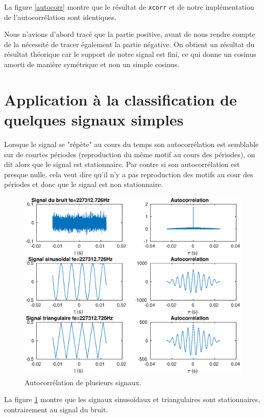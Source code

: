 \documentclass[french]{article}
\begin{document}
La figure \ref{autocorr} montre que le résultat de \verb`xcorr` et de notre implémentation de l'autocorrélation sont identiques.

Nous n'avions d'abord tracé que la partie positive, avant de nous rendre compte de la nécessité de tracer également la partie négative.
On obtient un résultat du résultat théorique car le support de notre signal est fini, ce qui donne un cosinus amorti de manière symétrique et non un simple cosinus.

\section{ Application à la classification de quelques signaux simples}

Lorsque le signal se "répète" au cours du temps son autocorrélation est semblable sur de courtes périodes (reproduction du même motif au cours des périodes), on dit alors que le signal est stationnaire. Par contre si son autocorrélation est presque nulle, cela veut dire qu'il n'y a pas reproduction des motifs au cour des périodes et donc que le signal est non stationnaire.

\begin{figure}[h!]
	\centering
	\includegraphics[width=1\textwidth]{images/classificationSig.eps}
	\caption{Autocorrélation de plusieurs signaux.}
	\label{classifSig}
\end{figure}

La figure \ref{classifSig} montre que les signaux sinusoïdaux et triangulaires sont stationnaires, contrairement au signal du bruit.
\end{document}
